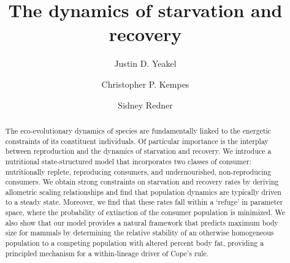 \documentclass[twocolumn,preprintnumbers,amsmath,amssymb,superscriptaddress]{revtex4}
\begin{document}
\author{Justin D. Yeakel} 

\author{Christopher P. Kempes} 

\author{Sidney Redner} 

\title{The dynamics of starvation and recovery}%


\begin{abstract} %
The eco-evolutionary dynamics of species are fundamentally linked to the energetic constraints of its constituent individuals. 
Of particular importance is the interplay between reproduction and the dynamics of starvation and recovery. %
We introduce a nutritional state-structured model that incorporates two classes of consumer: nutritionally replete, reproducing consumers, and undernourished, non-reproducing consumers. %
We obtain strong constraints on starvation and recovery rates by deriving allometric scaling relationships and find that population dynamics are typically driven to a steady state. %
Moreover, we find that these rates fall within a `refuge' in parameter space, where the probability of extinction of the consumer population is minimized. 
We also show that our model provides a natural framework that predicts
maximum body size for mammals by determining the relative stability of an
otherwise homogeneous population to a competing population with altered percent
body fat, providing a principled mechanism for a within-lineage driver of
Cope's rule.
\end{abstract}
\end{document}
